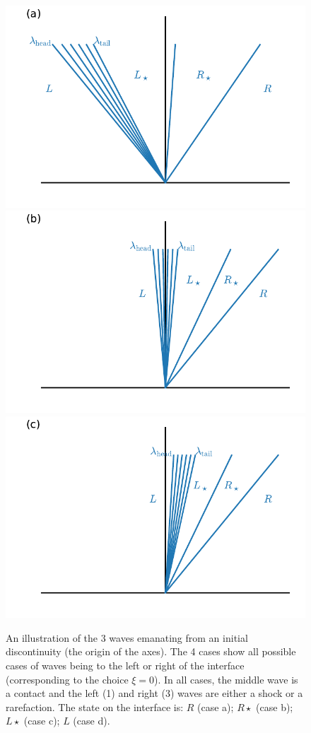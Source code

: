 \begin{figure}
\centering
\includegraphics[width=0.6\linewidth]{rarefaction_left} \\
\includegraphics[width=0.6\linewidth]{rarefaction_center} \\
\includegraphics[width=0.6\linewidth]{rarefaction_right}
\caption[Rarefaction configuration for the Riemann problem]
        {\label{fig:euler:rarefaction_sample} An illustration of the 3
          waves emanating from an initial discontinuity (the origin of
          the axes).  The 4 cases show all possible cases of waves
          being to the left or right of the interface (corresponding
          to the choice $\xi = 0$).  In all cases, the middle wave is
          a contact and the left (1) and right (3) waves are either a
          shock or a rarefaction.  The state on the interface is: $R$
          (case a); $R\star$ (case b); $L\star$ (case c); $L$ (case
          d).}
\end{figure}


